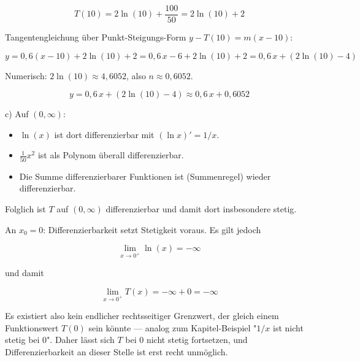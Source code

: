 \documentclass[11pt, a4paper]{article}
\begin{document}
\[
T(10) = 2\ln(10) + \frac{100}{50} = 2\ln(10) + 2
\]


Tangentengleichung über Punkt-Steigungs-Form $y - T(10) = m(x - 10)$:

\[
y = 0{,}6(x - 10) + 2\ln(10) + 2 = 0{,}6\, x - 6 + 2\ln(10) + 2 = 0{,}6\,x + (2\ln(10) - 4)
\]


Numerisch: $2\ln(10) \approx 4{,}6052$, also $n \approx 0{,}6052$.


\[
\boxed{y = 0{,}6\,x + (2\ln(10) - 4) \approx 0{,}6\,x + 0{,}6052}
\]


c) Auf $(0, \infty)$:

\begin{itemize}
  \item $\ln(x)$ ist dort differenzierbar mit $(\ln x)' = 1/x$.
  \item $\frac{1}{50}x^2$ ist als Polynom überall differenzierbar.
  \item Die Summe differenzierbarer Funktionen ist (Summenregel) wieder differenzierbar.
\end{itemize}

Folglich ist $T$ auf $(0, \infty)$ differenzierbar und damit dort insbesondere stetig.


An $x_0 = 0$: Differenzierbarkeit setzt Stetigkeit voraus. Es gilt jedoch

\[
\lim_{x\to 0^+} \ln(x) = -\infty
\]

und damit

\[
\lim_{x\to 0^+} T(x) = -\infty + 0 = -\infty
\]

Es existiert also kein endlicher rechtsseitiger Grenzwert, der gleich einem Funktionswert $T(0)$ sein könnte — analog zum Kapitel-Beispiel "$1/x$ ist nicht stetig bei 0". Daher lässt sich $T$ bei 0 nicht stetig fortsetzen, und Differenzierbarkeit an dieser Stelle ist erst recht unmöglich.





\end{document}
